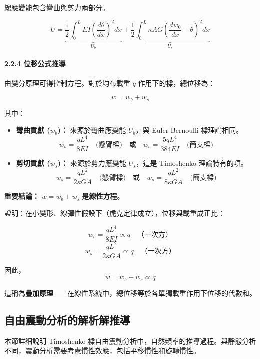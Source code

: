 \documentclass[UTF8, a4paper, 12pt]{ctexart}
\begin{document}
總應變能包含彎曲與剪力兩部分。

$$U = \underbrace{\frac{1}{2}\int_0^L EI\left(\frac{d\theta}{dx}\right)^2 dx}_{U_b} + \underbrace{\frac{1}{2}\int_0^L \kappa AG\left(\frac{dw_0}{dx} - \theta\right)^2 dx}_{U_s}$$

\paragraph{2.2.4 位移公式推導}

由變分原理可得控制方程。對於均布載重 $q$ 作用下的樑，總位移為：

$$w = w_b + w_s$$

其中：
\begin{itemize}
  \item \textbf{彎曲貢獻 ($w_b$)：} 來源於彎曲應變能 $U_b$，與 Euler-Bernoulli 樑理論相同。
  \begin{equation}
    w_b = \frac{qL^4}{8EI} \quad \text{(懸臂樑)} \quad \text{或} \quad w_b = \frac{5qL^4}{384EI} \quad \text{(簡支樑)}
  \end{equation}
  
  \item \textbf{剪切貢獻 ($w_s$)：} 來源於剪力應變能 $U_s$，這是 Timoshenko 理論特有的項。
  \begin{equation}
    w_s = \frac{qL^2}{2\kappa GA} \quad \text{(懸臂樑)} \quad \text{或} \quad w_s = \frac{qL^2}{8\kappa GA} \quad \text{(簡支樑)}
  \end{equation}
\end{itemize}

\textbf{重要結論：} $w = w_b + w_s$ 是\textbf{線性方程}。

證明：在小變形、線彈性假設下（虎克定律成立），位移與載重成正比：

$$w_b = \frac{qL^4}{8EI} \propto q \quad \text{（一次方）}$$
$$w_s = \frac{qL^2}{2\kappa GA} \propto q \quad \text{（一次方）}$$

因此，
$$w = w_b + w_s \propto q$$

這稱為\textbf{疊加原理}——在線性系統中，總位移等於各單獨載重作用下位移的代數和。

\subsection{自由震動分析的解析解推導}

本節詳細說明 Timoshenko 樑自由震動分析中，自然頻率的推導過程。與靜態分析不同，震動分析需要考慮慣性效應，包括平移慣性和旋轉慣性。
\end{document}
